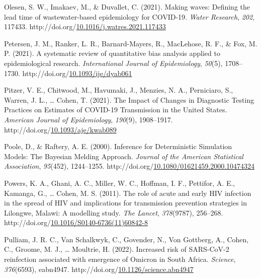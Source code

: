 \documentclass[12pt,twoside]{smiththesis}
\newlength{\cslhangindent}
\newenvironment{CSLReferences}[2] %
 {%
\setlength{\parindent}{0pt}
\ifodd #1 \everypar{\setlength{\hangindent}{\cslhangindent}}\ignorespaces\fi
\ifnum #2 > 0
\setlength{\parskip}{#2\baselineskip}
  \fi
}%
{}
\begin{document}
\begin{CSLReferences}{1}{0}
\leavevmode{}%
Olesen, S. W., Imakaev, M., \& Duvallet, C. (2021). Making waves: {Defining} the lead time of wastewater-based epidemiology for {COVID-19}. \emph{Water Research}, \emph{202}, 117433. http://doi.org/\href{https://doi.org/10.1016/j.watres.2021.117433}{10.1016/j.watres.2021.117433}

\leavevmode{}%
Petersen, J. M., Ranker, L. R., Barnard-Mayers, R., MacLehose, R. F., \& Fox, M. P. (2021). A systematic review of quantitative bias analysis applied to epidemiological research. \emph{International Journal of Epidemiology}, \emph{50}(5), 1708--1730. http://doi.org/\href{https://doi.org/10.1093/ije/dyab061}{10.1093/ije/dyab061}

\leavevmode{}%
Pitzer, V. E., Chitwood, M., Havumaki, J., Menzies, N. A., Perniciaro, S., Warren, J. L., \ldots{} Cohen, T. (2021). The {Impact} of {Changes} in {Diagnostic Testing Practices} on {Estimates} of {COVID-19 Transmission} in the {United States}. \emph{American Journal of Epidemiology}, \emph{190}(9), 1908--1917. http://doi.org/\href{https://doi.org/10.1093/aje/kwab089}{10.1093/aje/kwab089}

\leavevmode{}%
Poole, D., \& Raftery, A. E. (2000). Inference for {Deterministic Simulation Models}: {The Bayesian Melding Approach}. \emph{Journal of the American Statistical Association}, \emph{95}(452), 1244--1255. http://doi.org/\href{https://doi.org/10.1080/01621459.2000.10474324}{10.1080/01621459.2000.10474324}

\leavevmode{}%
Powers, K. A., Ghani, A. C., Miller, W. C., Hoffman, I. F., Pettifor, A. E., Kamanga, G., \ldots{} Cohen, M. S. (2011). The role of acute and early {HIV} infection in the spread of {HIV} and implications for transmission prevention strategies in {Lilongwe}, {Malawi}: A modelling study. \emph{The Lancet}, \emph{378}(9787), 256--268. http://doi.org/\href{https://doi.org/10.1016/S0140-6736(11)60842-8}{10.1016/S0140-6736(11)60842-8}

\leavevmode{}%
Pulliam, J. R. C., Van Schalkwyk, C., Govender, N., Von Gottberg, A., Cohen, C., Groome, M. J., \ldots{} Moultrie, H. (2022). Increased risk of {SARS-CoV-2} reinfection associated with emergence of {Omicron} in {South Africa}. \emph{Science}, \emph{376}(6593), eabn4947. http://doi.org/\href{https://doi.org/10.1126/science.abn4947}{10.1126/science.abn4947}


\end{CSLReferences}
\end{document}
